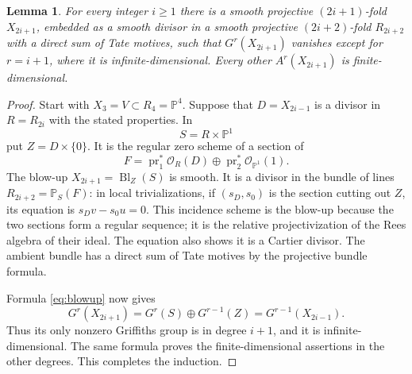 \documentclass[11pt]{article}
\newcommand{\PP}{\mathbb P}
\newtheorem{lemma}[theorem]{Lemma}
\theoremstyle{definition}
\theoremstyle{remark}
\begin{document}
\begin{lemma}\label{lem:induction}
For every integer $i\geq1$ there is a smooth projective $(2i+1)$-fold $X_{2i+1}$, embedded as a smooth divisor in a smooth projective $(2i+2)$-fold $R_{2i+2}$ with a direct sum of Tate motives, such that $G^r(X_{2i+1})$ vanishes except for $r=i+1$, where it is infinite-dimensional. Every other $A^r(X_{2i+1})$ is finite-dimensional.
\end{lemma}
\begin{proof}
Start with $X_3=V\subset R_4=\PP^4$. Suppose that $D=X_{2i-1}$ is a divisor in $R=R_{2i}$ with the stated properties. In
\[
 S=R\times\PP^1
\]
put $Z=D\times\{0\}$. It is the regular zero scheme of a section of
\[
 F=\operatorname{pr}_1^*\mathcal O_R(D)
          \oplus\operatorname{pr}_2^*\mathcal O_{\PP^1}(1).
\]
The blow-up $X_{2i+1}=\operatorname{Bl}_Z(S)$ is smooth. It is a divisor in the bundle of lines $R_{2i+2}=\PP_S(F)$: in local trivializations, if $(s_D,s_0)$ is the section cutting out $Z$, its equation is $s_Dv-s_0u=0$. This incidence scheme is the blow-up because the two sections form a regular sequence; it is the relative projectivization of the Rees algebra of their ideal. The equation also shows it is a Cartier divisor. The ambient bundle has a direct sum of Tate motives by the projective bundle formula.

Formula \eqref{eq:blowup} now gives
\[
 G^r(X_{2i+1})=G^r(S)\oplus G^{r-1}(Z)
                      =G^{r-1}(X_{2i-1}).
\]
Thus its only nonzero Griffiths group is in degree $i+1$, and it is infinite-dimensional. The same formula proves the finite-dimensional assertions in the other degrees. This completes the induction.
\end{proof}
\end{document}

